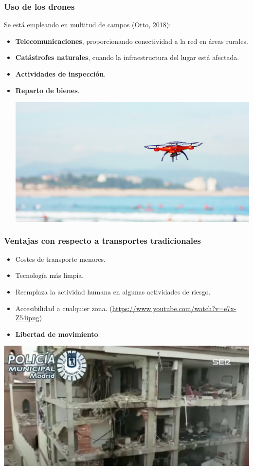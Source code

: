 \documentclass[slidestop,usepdftitle=false, xcolor=table]{beamer}
\begin{document}
	\begin{frame}
		\frametitle{Uso de los drones}
		Se está empleando en multitud de campos (Otto, 2018):
		\begin{itemize}
			\item \textbf{Telecomunicaciones}, proporcionando conectividad a la red en áreas rurales.
			\pause
			\item \textbf{Catástrofes naturales}, cuando la infraestructura del lugar está afectada.
			\pause
			\item \textbf{Actividades de inspección}.
			\pause
			\item \textbf{Reparto de bienes}.
			\begin{center}
				\includegraphics[width=0.55\linewidth]{imagen_dron}
			\end{center}
		\end{itemize}
	\end{frame}

	\begin{frame}
		\frametitle{Ventajas con respecto a transportes tradicionales}
		\begin{itemize}
			\item Costes de transporte menores.
			\pause
			\item Tecnología más limpia.
			\pause
			\item Reemplaza la actividad humana en algunas actividades de riesgo.
			\pause
			\item Accesibilidad a cualquier zona. (\url{https://www.youtube.com/watch?v=e7x-Z54ipug})
			\item \textbf{Libertad de movimiento}.
		\end{itemize}
		\begin{center}
			\includegraphics[width=0.55\linewidth]{dron_inspeccion}
		\end{center}
	\end{frame}
\end{document}
